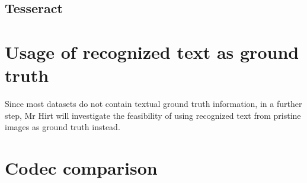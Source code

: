 \subsection{Tesseract}
\label{subsec:tesseract}

\section{Usage of recognized text as ground truth}
\label{sec:usage_of_recognized_text_as_ground_truth}

Since most datasets do not contain textual ground truth information,
in a further step, Mr Hirt will investigate the feasibility of
using recognized text from pristine images as ground truth instead.

\section{Codec comparison}
\label{sec:codec_comparison}


